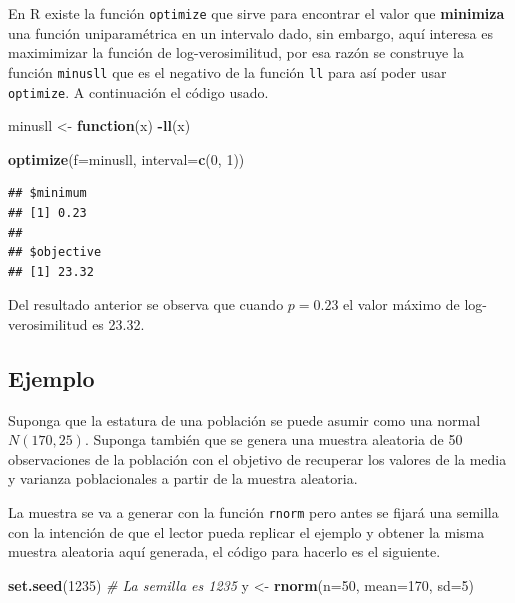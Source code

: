 \documentclass[10pt,]{krantz}
\makeatletter
\newenvironment{Shaded}{\begin{snugshade}}{\end{snugshade}}
\newcommand{\KeywordTok}[1]{\textcolor[rgb]{0.13,0.29,0.53}{\textbf{#1}}}
\newcommand{\DataTypeTok}[1]{\textcolor[rgb]{0.13,0.29,0.53}{#1}}
\newcommand{\DecValTok}[1]{\textcolor[rgb]{0.00,0.00,0.81}{#1}}
\newcommand{\StringTok}[1]{\textcolor[rgb]{0.31,0.60,0.02}{#1}}
\newcommand{\CommentTok}[1]{\textcolor[rgb]{0.56,0.35,0.01}{\textit{#1}}}
\newcommand{\ControlFlowTok}[1]{\textcolor[rgb]{0.13,0.29,0.53}{\textbf{#1}}}
\newcommand{\OperatorTok}[1]{\textcolor[rgb]{0.81,0.36,0.00}{\textbf{#1}}}
\newcommand{\NormalTok}[1]{#1}
\let\proglang=\textsf
\newenvironment{kframe}{%
\medskip{}
\setlength{\fboxsep}{.8em}
 \def\at@end@of@kframe{}%
 \ifinner\ifhmode%
  \def\at@end@of@kframe{\end{minipage}}%
  \begin{minipage}{\columnwidth}%
 \fi\fi%
 \def\FrameCommand##1{\hskip\@totalleftmargin \hskip-\fboxsep
 \colorbox{shadecolor}{##1}\hskip-\fboxsep
     \hskip-\linewidth \hskip-\@totalleftmargin \hskip\columnwidth}%
 \MakeFramed {\advance\hsize-\width
   \@totalleftmargin\z@ \linewidth\hsize
   \@setminipage}}%
 {\par\unskip\endMakeFramed%
 \at@end@of@kframe}
\renewenvironment{Shaded}{\begin{kframe}}{\end{kframe}}
\makeatother
\begin{document}
En \proglang{R} existe la función \texttt{optimize} que sirve para
encontrar el valor que \textbf{minimiza} una función uniparamétrica en
un intervalo dado, sin embargo, aquí interesa es maximimizar la función
de log-verosimilitud, por esa razón se construye la función
\texttt{minusll} que es el negativo de la función \texttt{ll} para así
poder usar \texttt{optimize}. A continuación el código usado.

\begin{Shaded}
\begin{Highlighting}[]
\NormalTok{minusll <-}\StringTok{ }\ControlFlowTok{function}\NormalTok{(x) }\OperatorTok{-}\KeywordTok{ll}\NormalTok{(x)}

\KeywordTok{optimize}\NormalTok{(}\DataTypeTok{f=}\NormalTok{minusll, }\DataTypeTok{interval=}\KeywordTok{c}\NormalTok{(}\DecValTok{0}\NormalTok{, }\DecValTok{1}\NormalTok{))}
\end{Highlighting}
\end{Shaded}

\begin{verbatim}
## $minimum
## [1] 0.23
## 
## $objective
## [1] 23.32
\end{verbatim}

Del resultado anterior se observa que cuando \(p=0.23\) el valor máximo
de log-verosimilitud es 23.32.

\subsection*{Ejemplo}\label{ejemplo-50}


Suponga que la estatura de una población se puede asumir como una normal
\(N(170, 25)\). Suponga también que se genera una muestra aleatoria de
50 observaciones de la población con el objetivo de recuperar los
valores de la media y varianza poblacionales a partir de la muestra
aleatoria.

La muestra se va a generar con la función \texttt{rnorm} pero antes se
fijará una semilla con la intención de que el lector pueda replicar el
ejemplo y obtener la misma muestra aleatoria aquí generada, el código
para hacerlo es el siguiente.

\begin{Shaded}
\begin{Highlighting}[]
\KeywordTok{set.seed}\NormalTok{(}\DecValTok{1235}\NormalTok{)  }\CommentTok{# La semilla es 1235}
\NormalTok{y <-}\StringTok{ }\KeywordTok{rnorm}\NormalTok{(}\DataTypeTok{n=}\DecValTok{50}\NormalTok{, }\DataTypeTok{mean=}\DecValTok{170}\NormalTok{, }\DataTypeTok{sd=}\DecValTok{5}\NormalTok{)}
\end{Highlighting}
\end{Shaded}
\end{document}
